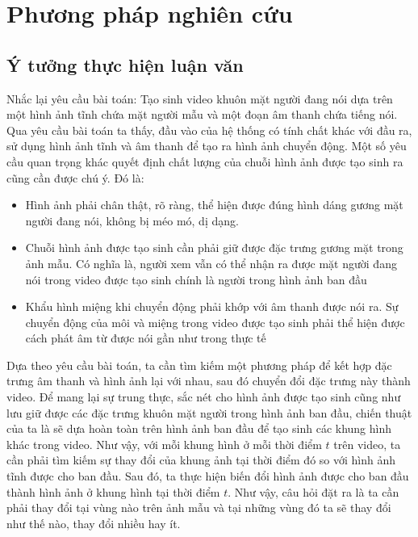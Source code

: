 \section{\texorpdfstring{Phương pháp nghiên cứu}{methodology}}

\subsection{Ý tưởng thực hiện luận văn}

Nhắc lại yêu cầu bài toán: Tạo sinh video khuôn mặt người đang nói dựa trên một hình ảnh tĩnh chứa mặt người mẫu và một đoạn âm thanh chứa tiếng nói. Qua yêu cầu bài toán ta thấy, đầu vào của hệ thống có tính chất khác với đầu ra, sử dụng hình ảnh tĩnh và âm thanh để tạo ra hình ảnh chuyển động. Một số yêu cầu quan trọng khác quyết định chất lượng của chuỗi hình ảnh được tạo sinh ra cũng cần được chú ý. Đó là:
\begin{itemize}
    \item Hình ảnh phải chân thật, rõ ràng, thể hiện được đúng hình dáng gương mặt người đang nói, không bị méo mó, dị dạng.
    \item Chuỗi hình ảnh được tạo sinh cần phải giữ được đặc trưng gương mặt trong ảnh mẫu. Có nghĩa là, người xem vẫn có thể nhận ra được mặt người đang nói trong video được tạo sinh chính là người trong hình ảnh ban đầu
    \item Khẩu hình miệng khi chuyển động phải khớp với âm thanh được nói ra. Sự chuyển động của môi và miệng trong video được tạo sinh phải thể hiện được cách phát âm từ được nói gần như trong thực tế
\end{itemize}

Dựa theo yêu cầu bài toán, ta cần tìm kiếm một phương pháp để kết hợp đặc trưng âm thanh và hình ảnh lại với nhau, sau đó chuyển đổi đặc trưng này thành video. Để mang lại sự trung thực, sắc nét cho hình ảnh được tạo sinh cũng như lưu giữ được các đặc trưng khuôn mặt người trong hình ảnh ban đầu, chiến thuật của ta là sẽ dựa hoàn toàn trên hình ảnh ban đầu để tạo sinh các khung hình khác trong video. Như vậy, với mỗi khung hình ở mỗi thời điểm $t$ trên video, ta cần phải tìm kiếm sự thay đổi của khung ảnh tại thời điểm đó so với hình ảnh tĩnh được cho ban đầu. Sau đó, ta thực hiện biến đổi hình ảnh được cho ban đầu thành hình ảnh ở khung hình tại thời điểm $t$. Như vậy, câu hỏi đặt ra là ta cần phải thay đổi tại vùng nào trên ảnh mẫu và tại những vùng đó ta sẽ thay đổi như thế nào, thay đổi nhiều hay ít.

